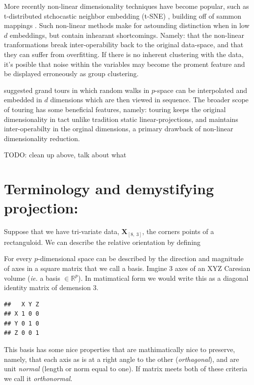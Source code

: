 \documentclass{monashthesis}
\begin{document}
More recently non-linear dimensionality techniques have become popular,
such as t-distributed stchocastic neighbor embedding (t-SNE)
\autocite{maaten_visualizing_2008}, building off of sammon mappings
\autocite{sammon_nonlinear_1969}. Such non-linear methods make for
astounding distinction when in low \(d\) embeddings, but contain
inhearant shortcomings. Namely: that the non-linear tranformations break
inter-operability back to the original data-space, and that they can
suffer from overfitting. If there is no inherent clustering with the
data, it's posible that noise within the variables may become the
proment feature and be displayed erroneously as group clustering.

\autocites{asimov_grand_1985}{buja_grand_1986} suggested grand tours in
which random walks in \(p\)-space can be interpolated and embedded in
\(d\) dimensions which are then viewed in sequence. The broader scope of
touring has some beneficial features, namely: touring keeps the original
dimensionality in tact unlike tradition static linear-projections, and
maintains inter-operabilty in the orginal dimensions, a primary drawback
of non-linear dimensionality reduction.

TODO: clean up above, talk about what

\section{Terminology and demystifying
projection:}\label{terminology-and-demystifying-projection}

Suppose that we have tri-variate data, \(\textbf{X}_{[8,~3]}\), the
corners points of a rectanguloid. We can describe the relative
orientation by defining

For every \(p\)-dimensional space can be described by the direction and
magnitude of axes in a square matrix that we call a basis. Imgine 3 axes
of an XYZ Caresian volume (\emph{ie.} a basis \(\in \mathbb{R}^p\)). In
matimatical form we would write this as a diagonal identity matrix of
demension 3.

\begin{verbatim}
##   X Y Z
## X 1 0 0
## Y 0 1 0
## Z 0 0 1
\end{verbatim}

This basis has some nice properties that are mathimatically nice to
preserve, namely, that each axis as is at a right angle to the other
(\emph{orthagonal}), and are unit \emph{normal} (length or norm equal to
one). If matrix meets both of these criteria we call it
\emph{orthonormal}.
\end{document}
